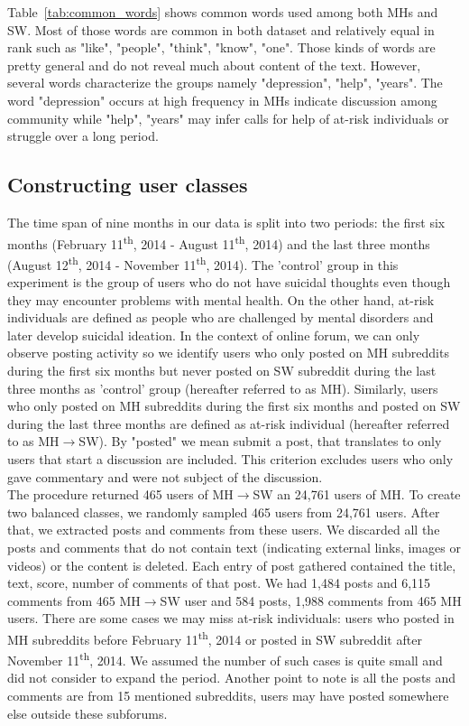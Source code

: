 Table~\ref{tab:common_words} shows common words used among both MHs and SW. Most of those words are common in both dataset and relatively equal in rank such as "like", "people", "think", "know", "one". Those kinds of words are pretty general and do not reveal much about content of the text. However, several words characterize the groups namely "depression", "help", "years". The word "depression" occurs at high frequency in MHs indicate discussion among community while "help", "years" may infer calls for help of at-risk individuals or struggle over a long period.
\subsection{Constructing user classes}
The time span of nine months in our data is split into two periods: the first six months (February 11\textsuperscript{th}, 2014 - August 11\textsuperscript{th}, 2014) and the last three months (August 12\textsuperscript{th}, 2014 - November 11\textsuperscript{th}, 2014). The 'control' group in this experiment is the group of users who do not have suicidal thoughts even though they may encounter problems with mental health. On the other hand, at-risk individuals are defined as people who are challenged by mental disorders and later develop suicidal ideation. In the context of online forum, we can only observe posting activity so we identify users who only posted on MH subreddits during the first six months but never posted on SW subreddit during the last three months as 'control' group (hereafter referred to as MH). Similarly, users who only posted on MH subreddits during the first six months and posted on SW during the last three months are defined as at-risk individual (hereafter referred to as MH$\rightarrow$SW). By "posted" we mean submit a post, that translates to only users that start a discussion are included. This criterion excludes users who only gave commentary and were not subject of the discussion.\\
The procedure returned 465 users of MH$\rightarrow$SW an 24,761 users of MH. To create two balanced classes, we randomly sampled 465 users from 24,761 users. After that, we extracted posts and comments from these users. We discarded all the posts and comments that do not contain text (indicating external links, images or videos) or the content is deleted. Each entry of post gathered contained the title, text, score, number of comments of that post. We had 1,484 posts and 6,115 comments from 465 MH$\rightarrow$SW user and 584 posts, 1,988 comments from 465 MH users. There are some cases we may miss at-risk individuals: users who posted in MH subreddits before February 11\textsuperscript{th}, 2014 or posted in SW subreddit after November 11\textsuperscript{th}, 2014. We assumed the number of such cases is quite small and did not consider to expand the period. Another point to note is all the posts and comments are from 15 mentioned subreddits, users may have posted somewhere else outside these subforums. 
